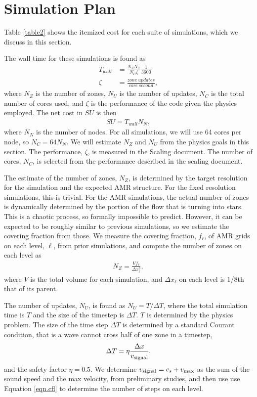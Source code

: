 \section{Simulation Plan}
\label{sec.plan}



Table \ref{table2} shows the itemized cost for each suite of simulations, which
we discuss in this section.

The wall time for these simulations is found as
\begin{align}
    T_{wall} &= \frac{N_Z N_U}{N_C \zeta} \frac{1}{3600}\label{eqn.twall}\\
    \zeta &= \frac{zone\ updates}{core\ second},
\end{align}
where $N_Z$ is the number of zones, $N_U$ is the number of updates, $N_C$ is the
total number of cores used, and $\zeta$ is the performance of the code given the
physics employed.  The net cost in $SU$ is then
\begin{align}
    SU = T_{wall} N_N, \label{eqn.su}
\end{align}
where $N_N$ is the number of nodes.  For all simulations, we will use 64 cores
per node, so $N_C=64 N_N$.  We will estimate $N_Z$ and $N_U$ from the physics
goals in this section.  The performance, $\zeta$, is measured in the Scaling
document.  The number of cores, $N_C$, is selected from the performance
described in the scaling document.

The estimate of the number of zones, $N_Z$,
is determined by the target resolution for the simulation and the expected AMR
structure.  For the fixed
resolution simulations, this is trivial.  
For the AMR
simulations, the actual number of zones  
 is dynamically determined by the portion of the flow
that is turning into stars.  
This is a chaotic process, so formally impossible
to predict.
However, it can be expected to be roughly similar to
previous simulations, so we estimate the covering fraction from those.   
We measure the covering fraction, $f_\ell$, of AMR grids on each level, $\ell$,
from prior simulations, and compute the number of zones on each level as
\begin{align}
    N_Z = \frac{V f_\ell}{\Delta x_\ell^3},
\end{align}
where $V$ is the total volume for each simulation, and $\Delta x_\ell$ on each level is 1/8th that of its parent.

The number of updates, $N_U$, is found as
$N_U=T/\Delta T$, where the total simulation time is $T$ and the size of the
timestep is $\Delta T$.  $T$ is determined by the physics
problem.  The size of the time step $\Delta T$ is
determined by a standard Courant condition, that is a wave cannot cross half of
one zone in a timestep, 
\begin{align}
\Delta T = \eta \frac{\Delta
x}{v_{\rm{signal}}}, \label{eqn.cfl}
\end{align}
and the safety factor $\eta = 0.5$.  We determine $v_{\rm{signal}}=c_s+v_{\rm{max}}$
 as the sum of the sound speed and the max velocity, from preliminary studies, and then use use Equation \ref{eqn.cfl} to
determine the number of steps on each level.

